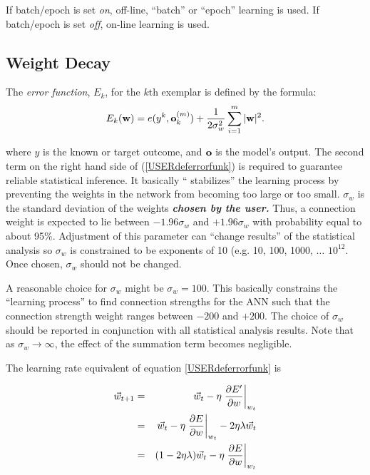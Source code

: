 If batch/epoch is set {\em on}, off-line, ``batch'' or ``epoch''
learning is used. If batch/epoch is set {\em off}, on-line learning is
used.

\subsection{Weight Decay}

The {\em error function}, $E_k$, for the $k$th exemplar is
defined by the formula:
\begin{equation}\label{USERdeferrorfunk}
E_k({\bf w}) =
e(y^k, {\bf o}^{(m)}_k) +
\frac{1}{2\sigma_w^2} \sum_{i=1}^m |{\bf w}|^2.
\end{equation}

where $y$ is the known or target outcome, and ${\bf o}$ is the model's
output.  The second term on the right hand side of
(\ref{USERdeferrorfunk}) is required to guarantee reliable statistical
inference. It basically `` stabilizes'' the learning process by
preventing the weights in the network from becoming too large or too
small.  $\sigma_w$ is the standard deviation of the weights {\em \bf
chosen by the user.}  Thus, a connection weight is expected to lie
between $-1.96 \sigma_w$ and $+1.96 \sigma_w$ with probability equal
to about 95\%. Adjustment of this parameter can ``change results'' of
the statistical analysis so $\sigma_w$ is constrained to be exponents
of 10 (e.g. 10, 100, 1000, $\ldots$ $10^{12}$.  Once chosen,
$\sigma_w$ should not be changed.

A reasonable choice for $\sigma_w$ might be $\sigma_w = 100$. This
basically constrains the ``learning process'' to find connection
strengths for the ANN such that the connection strength weight ranges
between $-200$ and $+200$. The choice of $\sigma_w$ should be reported
in conjunction with all statistical analysis results. Note that as
$\sigma_w \rightarrow \infty$, the effect of the summation term
becomes negligible.

The learning rate equivalent of equation \ref{USERdeferrorfunk} is

\begin{eqnarray*}
\vec w_{t+1} & = & \vec w_t - \eta \left. \frac{\partial E'}{\partial w} \right|_{w_t} \\
& = & \vec w_t - \eta \left. \frac{\partial E}{\partial w} \right|_{w_t} - 2\eta\lambda\vec w_t \\
& = & (1-2\eta\lambda)\vec w_t - \eta \left. \frac{\partial E}{\partial w} \right|_{w_t}
\end{eqnarray*}

